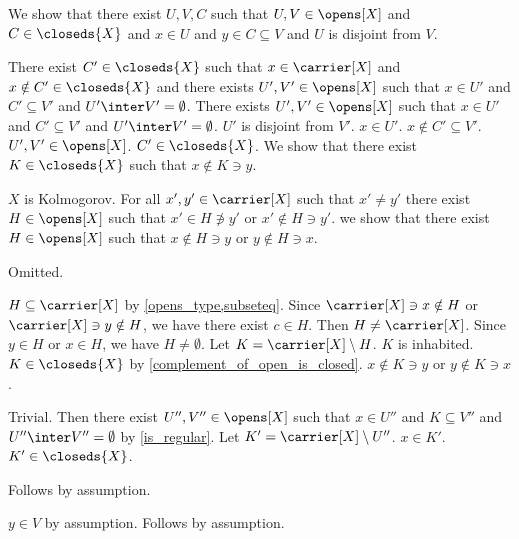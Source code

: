     We show that there exist $U,V,C$ such that $U,V \in \opens[X]$ and $C\in \closeds{X}$ and $x \in U$ and $y \in C \subseteq V$ and $U$ is disjoint from $V$.
    \begin{subproof}
        There exist $C' \in \closeds{X}$ such that $x \in \carrier[X]$ and $x \notin C' \in \closeds{X}$ and there exists $U',V' \in \opens[X]$ such that $x \in U'$ and $C' \subseteq V'$ and $U' \inter V' = \emptyset$.
        There exists $U',V' \in \opens[X]$ such that $x \in U'$ and $C' \subseteq V'$ and $U' \inter V' = \emptyset$.
        $U'$ is disjoint from $V'$.
        $x \in U'$.
        $x \notin C' \subseteq V'$.
        $U',V' \in \opens[X]$.
        $C' \in \closeds{X}$.
        We show that there exist $K \in \closeds{X}$ such that $x \notin K \ni y$.
        \begin{subproof}
            $X$ is Kolmogorov.
            For all $x',y'\in\carrier[X]$ such that $x'\neq y'$ there exist $H\in\opens[X]$ such that $x'\in H\not\ni y'$ or $x'\notin H\ni y'$.
            we show that there exist $H \in \opens[X]$ such that $x \notin H \ni y$ or $y \notin H \ni x$.
            \begin{subproof}
                Omitted.
            \end{subproof}
            $H \subseteq \carrier[X]$ by \cref{opens_type,subseteq}.
            Since $\carrier[X] \ni x \notin H$ or $\carrier[X] \ni y \notin H$, we have there exist $c \in H$. 
            Then $H \neq \carrier[X]$.
            Since $y \in H$ or $x \in H$, we have $H \neq \emptyset$.
            Let $K = \carrier[X] \setminus H$.
            $K$ is inhabited.
            $K \in \closeds{X}$ by \cref{complement_of_open_is_closed}.
            $x \notin K \ni y$ or $y \notin K \ni x$.
            \begin{byCase}
                 Trivial.
                Then there exist $U'',V'' \in \opens[X]$ such that $x \in U''$ and $K \subseteq V''$ and $U'' \inter V'' = \emptyset$ by \cref{is_regular}.
                Let $K' = \carrier[X] \setminus U''$.
                $x \in K'$.
                $K' \in \closeds{X}$.
            \end{byCase}


        \end{subproof}

        Follows by assumption.
    \end{subproof}
    $y \in V$ by assumption.
    Follows by assumption.

    
